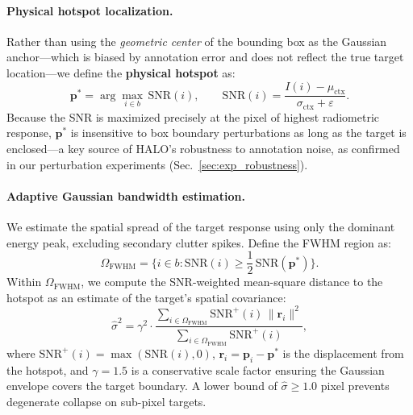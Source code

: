 \paragraph{Physical hotspot localization.}
Rather than using the \emph{geometric center} of the bounding box as the Gaussian
anchor---which is biased by annotation error and does not reflect the true target
location---we define the \textbf{physical hotspot} as:
\begin{equation}
    \mathbf{p}^* = \arg\max_{i \in b}\, \mathrm{SNR}(i),
    \qquad
    \mathrm{SNR}(i) = \frac{I(i) - \mu_\mathrm{ctx}}{\sigma_\mathrm{ctx} + \varepsilon}.
    \label{eq:hotspot}
\end{equation}
Because the SNR is maximized precisely at the pixel of highest radiometric response,
$\mathbf{p}^*$ is insensitive to box boundary perturbations as long as the target
is enclosed---a key source of HALO's robustness to annotation noise, as confirmed
in our perturbation experiments (Sec.~\ref{sec:exp_robustness}).

\paragraph{Adaptive Gaussian bandwidth estimation.}
We estimate the spatial spread of the target response using only the dominant energy
peak, excluding secondary clutter spikes.
Define the FWHM region as:
\begin{equation}
    \Omega_\mathrm{FWHM} = \bigl\{i \in b : \mathrm{SNR}(i) \geq
    {\textstyle\frac{1}{2}}\,\mathrm{SNR}(\mathbf{p}^*)\bigr\}.
    \label{eq:fwhm}
\end{equation}
Within $\Omega_\mathrm{FWHM}$, we compute the SNR-weighted mean-square distance to
the hotspot as an estimate of the target's spatial covariance:
\begin{equation}
    \hat{\sigma}^2 = \gamma^2 \cdot
    \frac{\sum_{i \in \Omega_\mathrm{FWHM}} \mathrm{SNR}^+(i)\,\|\mathbf{r}_i\|^2}
         {\sum_{i \in \Omega_\mathrm{FWHM}} \mathrm{SNR}^+(i)},
    \label{eq:pag_sigma}
\end{equation}
where $\mathrm{SNR}^+(i) = \max(\mathrm{SNR}(i), 0)$,
$\mathbf{r}_i = \mathbf{p}_i - \mathbf{p}^*$ is the displacement from the hotspot,
and $\gamma = 1.5$ is a conservative scale factor ensuring the Gaussian envelope
covers the target boundary.
A lower bound of $\hat{\sigma} \geq 1.0$ pixel prevents degenerate collapse on
sub-pixel targets.

